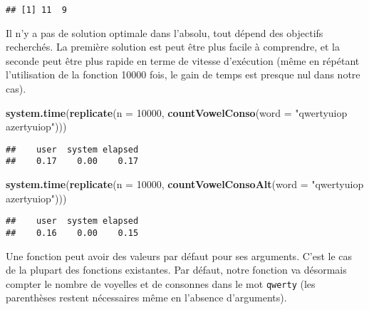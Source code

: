 \documentclass[]{book}
\newenvironment{Shaded}{\begin{snugshade}}{\end{snugshade}}
\newcommand{\KeywordTok}[1]{\textcolor[rgb]{0.13,0.29,0.53}{\textbf{#1}}}
\newcommand{\DataTypeTok}[1]{\textcolor[rgb]{0.13,0.29,0.53}{#1}}
\newcommand{\DecValTok}[1]{\textcolor[rgb]{0.00,0.00,0.81}{#1}}
\newcommand{\StringTok}[1]{\textcolor[rgb]{0.31,0.60,0.02}{#1}}
\newcommand{\NormalTok}[1]{#1}
\theoremstyle{definition}
\theoremstyle{definition}
\theoremstyle{definition}
\theoremstyle{remark}
\begin{document}
\begin{verbatim}
## [1] 11  9
\end{verbatim}

Il n'y a pas de solution optimale dans l'absolu, tout dépend des
objectifs recherchés. La première solution est peut être plus facile à
comprendre, et la seconde peut être plus rapide en terme de vitesse
d'exécution (même en répétant l'utilisation de la fonction 10000 fois,
le gain de temps est presque nul dans notre cas).

\begin{Shaded}
\begin{Highlighting}[]
\KeywordTok{system.time}\NormalTok{(}\KeywordTok{replicate}\NormalTok{(}\DataTypeTok{n =} \DecValTok{10000}\NormalTok{, }\KeywordTok{countVowelConso}\NormalTok{(}\DataTypeTok{word =} \StringTok{"qwertyuiop azertyuiop"}\NormalTok{)))}
\end{Highlighting}
\end{Shaded}

\begin{verbatim}
##    user  system elapsed 
##    0.17    0.00    0.17
\end{verbatim}

\begin{Shaded}
\begin{Highlighting}[]
\KeywordTok{system.time}\NormalTok{(}\KeywordTok{replicate}\NormalTok{(}\DataTypeTok{n =} \DecValTok{10000}\NormalTok{, }\KeywordTok{countVowelConsoAlt}\NormalTok{(}\DataTypeTok{word =} \StringTok{"qwertyuiop azertyuiop"}\NormalTok{)))}
\end{Highlighting}
\end{Shaded}

\begin{verbatim}
##    user  system elapsed 
##    0.16    0.00    0.15
\end{verbatim}

Une fonction peut avoir des valeurs par défaut pour ses arguments. C'est
le cas de la plupart des fonctions existantes. Par défaut, notre
fonction va désormais compter le nombre de voyelles et de consonnes dans
le mot \texttt{qwerty} (les parenthèses restent nécessaires même en
l'absence d'arguments).
\end{document}
